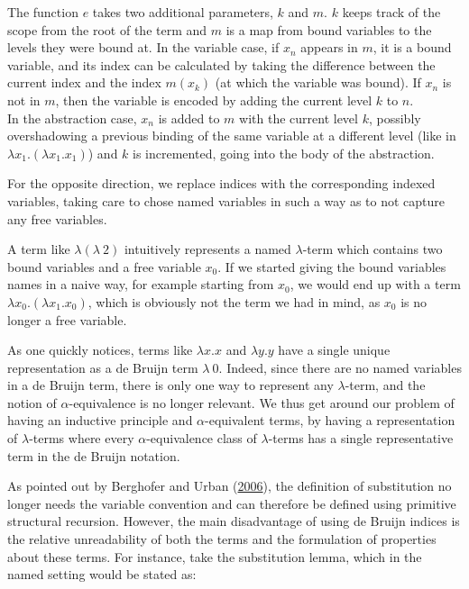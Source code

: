 \documentclass[a4paper, 12pt, twoside]{style/ociamthesis}
\theoremstyle{plain}
\theoremstyle{definition}
\newtheorem{Example}{Example}[chapter]
\theoremstyle{remark}
\renewenvironment{Example}{\begin{OldExample}\begin{mdframed}[style=example, linecolor=yellow]}{\end{mdframed}\end{OldExample}}
\begin{document}
The function \(e\) takes two additional parameters, \(k\) and \(m\).
\(k\) keeps track of the scope from the root of the term and \(m\) is a
map from bound variables to the levels they were bound at. In the
variable case, if \(x_n\) appears in \(m\), it is a bound variable, and
its index can be calculated by taking the difference between the current
index and the index \(m(x_k)\) (at which the variable was bound). If
\(x_n\) is not in \(m\), then the variable is encoded by adding the
current level \(k\) to \(n\).\\
In the abstraction case, \(x_n\) is added to \(m\) with the current
level \(k\), possibly overshadowing a previous binding of the same
variable at a different level (like in
\(\lambda x_1. (\lambda x_1. x_1)\)) and \(k\) is incremented, going
into the body of the abstraction.

For the opposite direction, we replace indices with the corresponding
indexed variables, taking care to chose named variables in such a way as
to not capture any free variables.\\

\begin{Example}

A term like \(\lambda (\lambda\ 2)\) intuitively represents a named
\(\lambda\)-term which contains two bound variables and a free variable
\(x_0\). If we started giving the bound variables names in a naive way,
for example starting from \(x_0\), we would end up with a term
\(\lambda x_0.(\lambda x_1.x_0)\), which is obviously not the term we
had in mind, as \(x_0\) is no longer a free variable.

\end{Example}

As one quickly notices, terms like \(\lambda x.x\) and \(\lambda y.y\)
have a single unique representation as a de Bruijn term \(\lambda\ 0\).
Indeed, since there are no named variables in a de Bruijn term, there is
only one way to represent any \(\lambda\)-term, and the notion of
\(\alpha\)-equivalence is no longer relevant. We thus get around our
problem of having an inductive principle and \(\alpha\)-equivalent
terms, by having a representation of \(\lambda\)-terms where every
\(\alpha\)-equivalence class of \(\lambda\)-terms has a single
representative term in the de Bruijn notation.

As pointed out by Berghofer and Urban
(\protect\hyperlink{ref-berghofer06}{2006}), the definition of
substitution no longer needs the variable convention and can therefore
be defined using primitive structural recursion. However, the main
disadvantage of using de Bruijn indices is the relative unreadability of
both the terms and the formulation of properties about these terms. For
instance, take the substitution lemma, which in the named setting would
be stated as:
\end{document}
